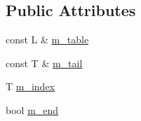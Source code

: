 \subsection*{Public Attributes}
\begin{DoxyCompactItemize}
\item 
const L \& \hyperlink{struct_simulator_1_1_linked_list_1_1const__iterator_a441ccfd84d590d0db01255a9e93b2e75}{m\+\_\+table}
\item 
const T \& \hyperlink{struct_simulator_1_1_linked_list_1_1const__iterator_a20b5a3e97a0bb527e810203b90b0f757}{m\+\_\+tail}
\item 
T \hyperlink{struct_simulator_1_1_linked_list_1_1const__iterator_a0a9191de644882cfeaaf56e27c23dea0}{m\+\_\+index}
\item 
bool \hyperlink{struct_simulator_1_1_linked_list_1_1const__iterator_af3f7d3d1a4da25721f378c996b9228e4}{m\+\_\+end}
\end{DoxyCompactItemize}


